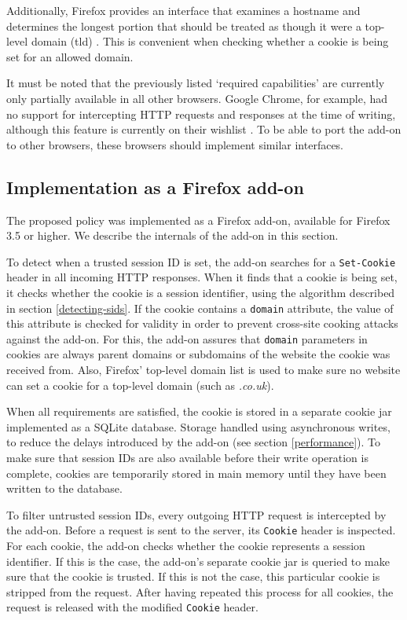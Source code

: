Additionally, Firefox provides an interface that examines a hostname and determines the longest portion that should be treated as though it were a top-level domain (\gls{tld}) \cite{MozillaDevelopers2010}. This is convenient when checking whether a cookie is being set for an allowed domain.

It must be noted that the previously listed `required capabilities' are currently only partially available in all other browsers. Google Chrome, for example, had no support for intercepting HTTP requests and responses at the time of writing, although this feature is currently on their wishlist \cite{ChromiumWishlist}. To be able to port the add-on to other browsers, these browsers should implement similar interfaces.

\subsection{Implementation as a Firefox add-on}

The proposed policy was implemented as a Firefox add-on, available for Firefox 3.5 or higher. We describe the internals of the add-on in this section.

To detect when a trusted session ID is set, the add-on searches for a \texttt{Set-Cookie} header in all incoming HTTP responses. When it finds that a cookie is being set, it checks whether the cookie is a session identifier, using the algorithm described in section \ref{detecting-sids}. If the cookie contains a \texttt{domain} attribute, the value of this attribute is checked for validity in order to prevent cross-site cooking attacks \cite{Zalewski2006} against the add-on. For this, the add-on assures that \texttt{domain} parameters in cookies are always parent domains or subdomains of the website the cookie was received from. Also, Firefox' top-level domain list \cite{MozillaDevelopers2010} is used to make sure no website can set a cookie for a top-level domain (such as \emph{.co.uk}).

When all requirements are satisfied, the cookie is stored in a separate cookie jar implemented as a SQLite database. Storage handled using asynchronous writes, to reduce the delays introduced by the add-on (see section \ref{performance}). To make sure that session IDs are also available before their write operation is complete, cookies are temporarily stored in main memory until they have been written to the database.

To filter untrusted session IDs, every outgoing HTTP request is intercepted by the add-on. Before a request is sent to the server, its \texttt{Cookie} header is inspected. For each cookie, the add-on checks whether the cookie represents a session identifier. If this is the case, the add-on's separate cookie jar is queried to make sure that the cookie is trusted. If this is not the case, this particular cookie is stripped from the request. After having repeated this process for all cookies, the request is released with the modified \texttt{Cookie} header.

